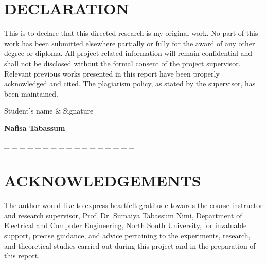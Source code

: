 \documentclass[12pt,letterpaper]{report}
\begin{document}
\setlength{\parskip}{10pt}

\chapter*{DECLARATION}

\vspace{24pt}

\setlength{\parskip}{0pt}

{\fontsize{12}{17}\selectfont This is to declare that this directed research is my original work. No part of this work has been submitted elsewhere partially or fully for the award of any other degree or diploma. All project related information will remain confidential and shall not be disclosed without the formal consent of the project supervisor. Relevant previous works presented in this report have been properly acknowledged and cited. The plagiarism policy, as stated by the supervisor, has been maintained.}

\vspace{24pt}

{\fontsize{14}{17}\selectfont Student's name \& Signature}

\vspace{12pt}

{\fontsize{14}{17}\selectfont\bfseries Nafisa Tabassum}

\vspace{6pt}

{\fontsize{14}{17}\selectfont \_ \_ \_ \_ \_ \_ \_ \_ \_ \_ \_ \_ \_ \_ \_ \_ \_}

\setlength{\parskip}{10pt}

\chapter*{ACKNOWLEDGEMENTS}

\vspace{12pt}

\hspace{0.5in}The author would like to express heartfelt gratitude towards the course instructor and research supervisor, Prof. Dr. Sumaiya Tabassum Nimi, Department of Electrical and Computer Engineering, North South University, for invaluable support, precise guidance, and advice pertaining to the experiments, research, and theoretical studies carried out during this project and in the preparation of this report.
\end{document}

